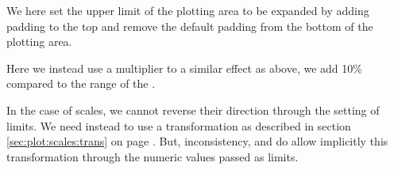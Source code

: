 \documentclass[krantz2]{krantz}\usepackage{knitr}%
\begin{document}
We here set the upper limit of the plotting area to be expanded by adding padding to the top and remove the default padding from the bottom of the plotting area.

\begin{knitrout}\footnotesize
{}\color{fgcolor}\begin{kframe}
\begin{alltt}
  \hlstd{(}      \hlopt{+}
  \hlstd{(} \hlstd{=} \hlstd{)} \hlopt{+}
  \hlstd{(} \hlstd{=} \hlstd{(} \hlstd{=} \hlstd{(}\hlstd{,} \hlstd{)))}
\end{alltt}
\end{kframe}
\end{knitrout}

Here we instead use a multiplier to a similar effect as above, we add 10\% compared to the range of the .

\begin{knitrout}\footnotesize
{}\color{fgcolor}\begin{kframe}
\begin{alltt}
  \hlstd{(} \hlstd{=} \hlstd{(} \hlstd{=} \hlstd{(}\hlstd{,} \hlstd{)))}
\end{alltt}
\end{kframe}
\end{knitrout}

In the case of scales, we cannot reverse their direction through the setting of limits. We need instead to use a transformation as described in section \ref{sec:plot:scales:trans} on page \pageref{sec:plot:scales:trans}. But, inconsistency,  and  do allow implicitly this transformation through the numeric values passed as limits.

\end{document}
